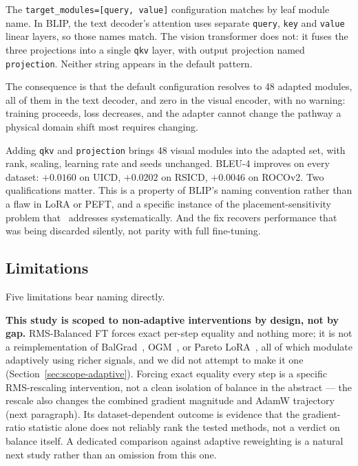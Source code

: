 \documentclass[journal]{IEEEtran}
\begin{document}
The \texttt{target\_modules=[query, value]} configuration matches
by leaf module name. In BLIP, the text decoder's attention uses
separate \texttt{query}, \texttt{key} and \texttt{value} linear
layers, so those names match. The vision transformer does not: it
fuses the three projections into a single \texttt{qkv} layer,
with output projection named \texttt{projection}. Neither string
appears in the default pattern.

The consequence is that the default configuration resolves to 48
adapted modules, all of them in the text decoder, and zero in the
visual encoder, with no warning: training proceeds, loss decreases, and the adapter cannot change the pathway a physical domain shift most requires changing.

Adding \texttt{qkv} and \texttt{projection} brings 48 visual
modules into the adapted set, with rank, scaling, learning rate and seeds unchanged. BLEU-4 improves on every dataset: $+0.0160$ on UICD, $+0.0202$ on RSICD, $+0.0046$ on ROCOv2. Two
qualifications matter. This is a property of BLIP's naming convention rather than a flaw in LoRA or PEFT, and a specific instance of the placement-sensitivity problem that~\cite{hayou2025plop} addresses systematically. And the fix recovers performance that was being discarded silently, not parity with full fine-tuning.

\subsection{Limitations}
\label{sec:limitations}

Five limitations bear naming directly.

\textbf{This study is scoped to non-adaptive interventions by
design, not by gap.} RMS-Balanced FT forces exact per-step
equality and nothing more; it is not a reimplementation of
BalGrad~\cite{gim2025seesaw}, OGM~\cite{peng2022ogm,wei2024onthefly},
or Pareto LoRA~\cite{paretolora2026}, all of which modulate
adaptively using richer signals, and we did not attempt to make it
one (Section~\ref{sec:scope-adaptive}). Forcing exact equality every step is a specific RMS-rescaling intervention, not a clean isolation of balance in the abstract — the rescale also changes the combined gradient magnitude and AdamW trajectory (next paragraph). Its dataset-dependent outcome is evidence that the gradient-ratio statistic alone does not reliably rank the tested methods, not a verdict on balance itself. A dedicated comparison against adaptive reweighting is a natural next study rather than an omission from this one.
\end{document}
